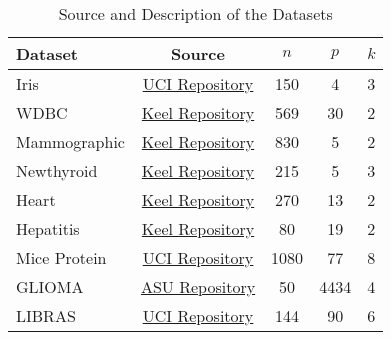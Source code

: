 \documentclass{article}
\begin{document}
 \begin{table}
    \centering
    \caption{Source and Description of the Datasets}
    \label{tab:source}
    \begin{tabular}{|l|c|c|c|c|}
    \hline
        Dataset & Source & $n$ & $p$ & $k$   \\
        \hline
         Iris & \href{https://archive.ics.uci.edu/ml/datasets.php}{UCI Repository} & 150 & 4 & 3\\
         WDBC & \href{https://sci2s.ugr.es/keel/category.php?cat=clas}{Keel Repository} & 569 & 30 & 2\\
         Mammographic & \href{https://sci2s.ugr.es/keel/category.php?cat=clas}{Keel Repository} & 830 & 5 & 2\\
         Newthyroid & \href{https://sci2s.ugr.es/keel/category.php?cat=clas}{Keel Repository} & 215 & 5 & 3\\
         Heart & \href{https://sci2s.ugr.es/keel/category.php?cat=clas}{Keel Repository} & 270 & 13 & 2\\
         Hepatitis & \href{https://sci2s.ugr.es/keel/category.php?cat=clas}{Keel Repository} & 80 & 19 & 2\\
         Mice Protein & \href{https://archive.ics.uci.edu/ml/datasets.php}{UCI Repository} & 1080 & 77 & 8\\
         GLIOMA & \href{http://featureselection.asu.edu/index.php}{ASU Repository} & 50 & 4434 & 4\\
         LIBRAS & \href{https://archive.ics.uci.edu/ml/datasets.php}{UCI Repository} & 144 & 90 & 6 \\
         \hline
    \end{tabular}
\end{table}
\end{document}
